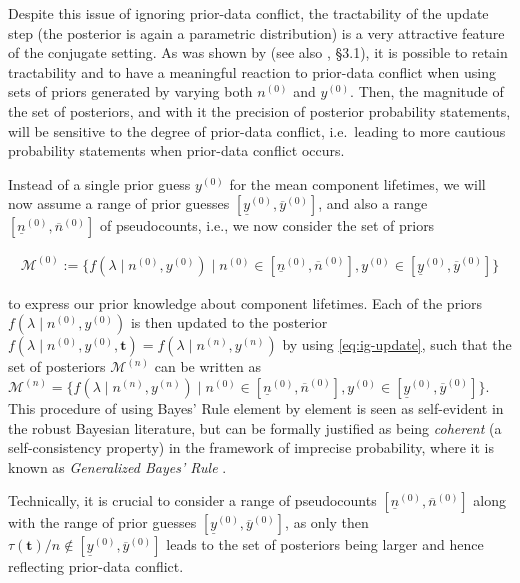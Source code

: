 \documentclass[Journal,SectionNumbers,SingleSpace,InsideFigs]{ascelike}
\renewcommand{\vec}[1]{{\bm#1}}
\newcommand{\uz}{^{(0)}} %
\newcommand{\un}{^{(n)}} %
\newcommand{\ul}[1]{\underline{#1}}
\newcommand{\ol}[1]{\overline{#1}}
\def\yz{y\uz}
\def\yn{y\un}
\def\yzl{\ul{y}\uz}
\def\yzu{\ol{y}\uz}
\def\nz{n\uz}
\def\nn{n\un}
\def\nzl{\ul{n}\uz}
\def\nzu{\ol{n}\uz}
\def\taut{\tau(\vec{t})}
\def\MZ{\mathcal{M}\uz}
\def\MN{\mathcal{M}\un}
\begin{document}
Despite this issue of ignoring prior-data conflict,
the tractability of the update step
(the posterior is again a parametric distribution)
is a very attractive feature of the conjugate setting.
As was shown by  (see also , \S 3.1),
it is possible to retain tractability and to have a meaningful reaction to prior-data conflict
when using sets of priors generated by varying both $\nz$ and $\yz$.
Then, the magnitude of the set of posteriors,
and with it the precision of posterior probability statements,
will be sensitive to the degree of prior-data conflict,
i.e.\ leading to more cautious probability statements when prior-data conflict occurs.

Instead of a single prior guess $\yz$ for the mean component lifetimes,
we will now assume a range of prior guesses $[\yzl, \yzu]$, and also a range $[\nzl, \nzu]$ of pseudocounts,
i.e., we now consider the set of priors
\begin{linenomath*}
\begin{align}
\MZ := \{ f(\lambda\mid\nz,\yz) \mid \nz \in [\nzl, \nzu], \yz \in [\yzl, \yzu] \}
\label{eq:setofpriors}
\end{align}
\end{linenomath*}
to express our prior knowledge about component lifetimes.
Each of the priors $f(\lambda\mid\nz,\yz)$ is then updated to the posterior
$f(\lambda\mid\nz,\yz,\vec{t}) = f(\lambda\mid\nn,\yn)$
by using \eqref{eq:ig-update},
such that the set of posteriors $\MN$ can be written as
$\MN = \{ f(\lambda\mid\nn,\yn) \mid \nz \in [\nzl, \nzu], \yz \in [\yzl, \yzu] \}$.
This procedure of using Bayes' Rule element by element
is seen as self-evident in the robust Bayesian literature,
but can be formally justified as being \emph{coherent}
(a self-consistency property)
in the framework of imprecise probability, where it is known as
\emph{Generalized Bayes' Rule} \cite[\S 6.4]{1991:walley}.

Technically, it is crucial to consider a range of pseudocounts $[\nzl, \nzu]$
along with the range of prior guesses $[\yzl, \yzu]$,
as only then $\taut/n \not\in [\yzl, \yzu]$
leads to the set of posteriors being larger
and hence reflecting prior-data conflict.
\end{document}
